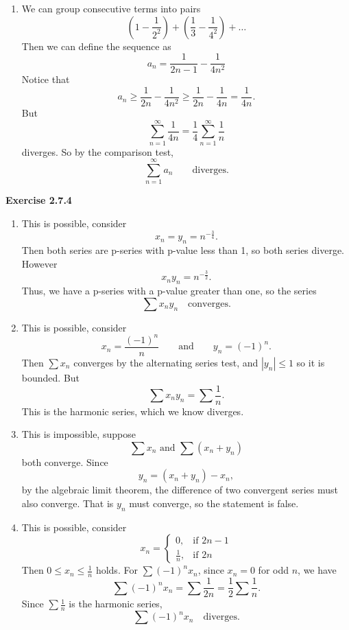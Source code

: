 \documentclass[12pt]{article}
\begin{document}
\begin{enumerate}[label=(\alph*)]
    \item We can group consecutive terms into pairs
          \[
              (1 - \frac{1}{2^2}) + (\frac{1}{3} - \frac{1}{4^2}) + \dots
          \]
          Then we can define the sequence as
          \[
              a_n = \frac{1}{2n-1}  - \frac{1}{4n^2}
          \]
          Notice that
          \[
              a_n \geq \frac{1}{2n} - \frac{1}{4n^2} \geq \frac{1}{2n} - \frac{1}{4n} = \frac{1}{4n}.
          \]
          But
          \[
              \sum_{n=1}^{\infty} \frac{1}{4n} = \frac{1}{4} \sum_{n=1}^{\infty} \frac{1}{n}
          \]
          diverges.
          So by the comparison test,
          \[
              \sum_{n=1}^{\infty}  a_n \qquad \text{diverges.}
          \]

\end{enumerate}

\textbf{Exercise 2.7.4}
\begin{enumerate}[label=(\alph*)]
    \item This is possible, consider
          \[
              x_n = y_n = n^{-\frac{3}{4}}.
          \]
          Then both series are p-series with p-value less than 1, so both series diverge.
          However
          \[
              x_n y_n = n^{-\frac{3}{2}}.
          \]
          Thus, we have a p-series with a p-value greater than one, so the series
          \[
              \sum x_n y_n \quad \text{converges.}
          \]
    \item This is possible, consider
          \[
              x_n = \frac{(-1)^{n}}{n} \qquad \text{and} \qquad y_n = (-1)^{n}.
          \]
          Then \( \sum x_n \) converges by the alternating series test, and \( |y_n| \leq 1 \) so it is bounded.
          But
          \[
              \sum x_n y_n = \sum \frac{1}{n}.
          \]
          This is the harmonic series, which we know diverges.

    \item This is impossible, suppose
          \[
              \sum x_n \text{ and } \sum (x_n + y_n)
          \]
          both converge. Since
          \[
              y_n = (x_n + y_n) - x_n,
          \]
          by the algebraic limit theorem, the difference of two convergent series must also converge.
          That is \( y_n \) must converge, so the statement is false.

    \item This is possible, consider
          \[
              x_n = \begin{cases}
                  0,           & \text{if } 2n-1 \\
                  \frac{1}{n}, & \text{if } 2n
              \end{cases}
          \]
          Then \( 0 \leq x_n \leq \frac{1}{n} \) holds.
          For \( \sum (-1)^n x_n \), since \( x_n = 0 \) for odd \( n \), we have
          \[
              \sum (-1)^n x_n = \sum \frac{1}{2n} = \frac{1}{2} \sum  \frac{1}{n}.
          \]
          Since \( \sum \frac{1}{n} \) is the harmonic series,
          \[
              \sum (-1)^n x_n  \quad \text{diverges.}
          \]
\end{enumerate}
\end{document}
